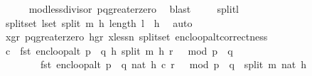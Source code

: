 \begin{isabellebody}
\ \ \ \ \isamarkupfalse%
\ mod{\isacharunderscore}{\kern0pt}less{\isacharunderscore}{\kern0pt}divisor\ pq{\isacharunderscore}{\kern0pt}greater{\isacharunderscore}{\kern0pt}zero\ \isamarkupfalse%
\ blast\ \isanewline
\isanewline
\ \ \isamarkupfalse%
\ split{\isacharunderscore}{\kern0pt}l\ \isamarkupfalse%
\ split{\isacharunderscore}{\kern0pt}set{\isacharcolon}{\kern0pt}\ {\isachardoublequoteopen}{\isasymforall}l{\isasymin}set\ {\isacharparenleft}{\kern0pt}split\ m\ h{\isacharparenright}{\kern0pt}{\isachardot}{\kern0pt}\ length\ l\ {\isasymle}\ h{\isachardoublequoteclose}\ \isamarkupfalse%
\ auto\isanewline
\isanewline
\ \ \isamarkupfalse%
\ x{\isacharunderscore}{\kern0pt}gr{\isacharunderscore}{\kern0pt}{}\ pq{\isacharunderscore}{\kern0pt}greater{\isacharunderscore}{\kern0pt}zero\ h{\isacharunderscore}{\kern0pt}gr{\isacharunderscore}{\kern0pt}{}\ x{\isacharunderscore}{\kern0pt}less{\isacharunderscore}{\kern0pt}n\ split{\isacharunderscore}{\kern0pt}set\ enc{\isacharunderscore}{\kern0pt}loop{\isacharunderscore}{\kern0pt}alt{\isacharunderscore}{\kern0pt}correctness\ \isanewline
\ \ \isamarkupfalse%
\ {\isachardoublequoteopen}c\ {\isacharequal}{\kern0pt}\ fst\ {\isacharparenleft}{\kern0pt}enc{\isacharunderscore}{\kern0pt}loop{\isacharunderscore}{\kern0pt}alt\ {\isacharparenleft}{\kern0pt}p\ {\isacharasterisk}{\kern0pt}\ q{\isacharcomma}{\kern0pt}\ h{\isacharcomma}{\kern0pt}\ {\isacharparenleft}{\kern0pt}split\ m\ h{\isacharparenright}{\kern0pt}{\isacharparenright}{\kern0pt}\ {\isacharparenleft}{\kern0pt}r\ {\isacharcircum}{\kern0pt}\ {}\ mod\ {\isacharparenleft}{\kern0pt}p\ {\isacharasterisk}{\kern0pt}\ q{\isacharparenright}{\kern0pt}{\isacharparenright}{\kern0pt}{\isacharparenright}{\kern0pt}\ {\isasymLongrightarrow}\ \isanewline
\ \ \ \ \ \ \ \ fst\ {\isacharparenleft}{\kern0pt}enc{\isacharunderscore}{\kern0pt}loop{\isacharunderscore}{\kern0pt}alt\ {\isacharparenleft}{\kern0pt}p\ {\isacharasterisk}{\kern0pt}\ q{\isacharcomma}{\kern0pt}\ {\isacharparenleft}{\kern0pt}nat\ h{\isacharparenright}{\kern0pt}{\isacharcomma}{\kern0pt}\ c{\isacharparenright}{\kern0pt}\ {\isacharparenleft}{\kern0pt}r\ {\isacharcircum}{\kern0pt}\ {}\ mod\ {\isacharparenleft}{\kern0pt}p\ {\isacharasterisk}{\kern0pt}\ q{\isacharparenright}{\kern0pt}{\isacharparenright}{\kern0pt}{\isacharparenright}{\kern0pt}\ {\isacharequal}{\kern0pt}\ {\isacharparenleft}{\kern0pt}split\ m\ {\isacharparenleft}{\kern0pt}nat\ h{\isacharparenright}{\kern0pt}{\isacharparenright}{\kern0pt}{\isachardoublequoteclose}\ \isamarkupfalse%

\end{isabellebody}
